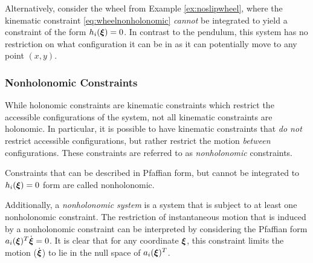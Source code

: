 Alternatively, consider the wheel from Example \ref{ex:noslipwheel}, where the kinematic constraint \eqref{eq:wheelnonholonomic} \textit{cannot} be integrated to yield a constraint of the form $h_i(\bm{\xi}) = 0$. In contrast to the pendulum, this system has no restriction on what configuration it can be in as it can potentially move to any point $(x,y)$.




\subsubsection{Nonholonomic Constraints}
While holonomic constraints are kinematic constraints which restrict the accessible configurations of the system, not all kinematic constraints are holonomic. In particular, it is possible to have kinematic constraints that \textit{do not} restrict accessible configurations, but rather restrict the motion \textit{between} configurations. These constraints are referred to as \textit{nonholonomic} constraints.

\begin{definition} 
Constraints that can be described in Pfaffian form, but cannot be integrated to $h_i(\bm{\xi}) = 0 $ form are called nonholonomic.
\end{definition}
Additionally, a \textit{nonholonomic system} is a system that is subject to at least one nonholonomic constraint.
The restriction of instantaneous motion that is induced by a nonholonomic constraint can be interpreted by considering the Pfaffian form $a_i(\bm{\xi})^T\dot{\bm{\xi}} = 0$. It is clear that for any coordinate $\bm{\xi}$, this constraint limits the motion ($\dot{\bm{\xi}}$) to lie in the null space of $a_i(\bm{\xi})^T$.

